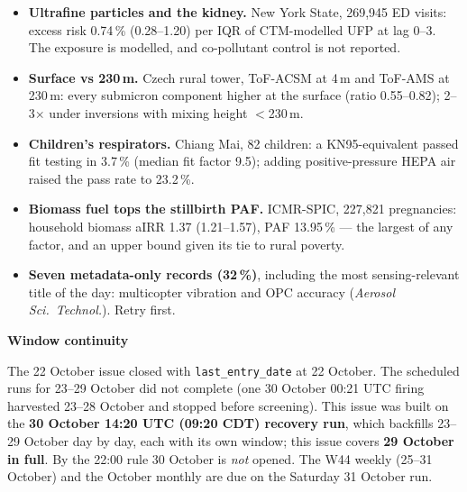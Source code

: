 \documentclass[10pt]{article}
\begin{document}
\footnotesize
\begin{itemize}

\item \textbf{Ultrafine particles and the kidney.} New York State, 269,945 ED visits: excess risk 0.74\,\% (0.28--1.20)
per IQR of CTM-modelled UFP at lag 0--3. The exposure is modelled, and co-pollutant control is not reported.

\item \textbf{Surface vs 230\,m.} Czech rural tower, ToF-ACSM at 4\,m and ToF-AMS at 230\,m: every submicron component
higher at the surface (ratio 0.55--0.82); 2--3$\times$ under inversions with mixing height $<$230\,m.

\item \textbf{Children's respirators.} Chiang Mai, 82 children: a KN95-equivalent passed fit testing in 3.7\,\%
(median fit factor 9.5); adding positive-pressure HEPA air raised the pass rate to 23.2\,\%.

\item \textbf{Biomass fuel tops the stillbirth PAF.} ICMR-SPIC, 227,821 pregnancies: household biomass aIRR 1.37
(1.21--1.57), PAF 13.95\,\% --- the largest of any factor, and an upper bound given its tie to rural poverty.

\item \textbf{Seven metadata-only records (32\,\%)}, including the most sensing-relevant title of the day: multicopter
vibration and OPC accuracy (\emph{Aerosol Sci.\ Technol.}). Retry first.

\end{itemize}

\vspace{2mm}

\begin{keybox}
{\sffamily\bfseries\footnotesize\color{Deep}Window continuity}\\[1.2mm]
{\fontsize{7.2}{8.8}\selectfont
The 22 October issue closed with \texttt{last\_entry\_date} at 22 October. The scheduled runs for 23--29 October
did not complete (one 30 October 00:21 UTC firing harvested 23--28 October and stopped before screening). This issue
was built on the \textbf{30 October 14:20 UTC (09:20 CDT) recovery run}, which backfills 23--29 October day by day,
each with its own window; this issue covers \textbf{29 October in full}. By the 22:00 rule 30 October is \emph{not}
opened. The W44 weekly (25--31 October) and the October monthly are due on the Saturday 31 October run.\par}
\end{keybox}
\end{document}

